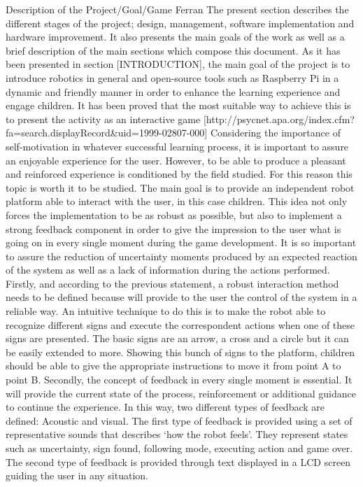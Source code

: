 Description of the Project/Goal/Game Ferran
The present section describes the different stages of the project; design, management, software implementation and hardware improvement. It also presents the main goals of the work as well as a brief description of the main sections which compose this document.
As it has been presented in section [INTRODUCTION], the main goal of the project is to introduce robotics in general and open-source tools such as Raspberry Pi in a dynamic and friendly manner in order to enhance the learning experience and engage children. It has been proved that the most suitable way to achieve this is to present the activity as an interactive game [http://psycnet.apa.org/index.cfm?fa=search.displayRecord&uid=1999-02807-000]
Considering the importance of self-motivation in whatever successful learning process, it is important to assure an enjoyable experience for the user. However, to be able to produce a pleasant and reinforced experience is conditioned by the field studied. For this reason this topic is worth it to be studied.
The main goal is to provide an independent robot platform able to interact with the user, in this case children. This idea not only forces the implementation to be as robust as possible, but also to implement a strong feedback component in order to give the impression to the user what is going on in every single moment during the game development. It is so important to assure the reduction of uncertainty moments produced by an expected reaction of the system as well as a lack of information during the actions performed. 
Firstly, and according to the previous statement, a robust interaction method needs to be defined because will provide to the user the control of the system in a reliable way. An intuitive technique to do this is to make the robot able to recognize different signs and execute the correspondent actions when one of these signs are presented. The basic signs are an arrow, a cross and a circle but it can be easily extended to more. Showing this bunch of signs to the platform, children should be able to give the appropriate instructions to move it from point A to point B.
Secondly, the concept of feedback in every single moment is essential. It will provide the current state of the process, reinforcement or additional guidance to continue the experience. In this way, two different types of feedback are defined: Acoustic and visual. 
The first type of feedback is provided using a set of representative sounds that describes ‘how the robot feels’. They represent states such as uncertainty, sign found, following mode, executing action and game over. The second type of feedback is provided through text displayed in a LCD screen guiding the user in any situation.
